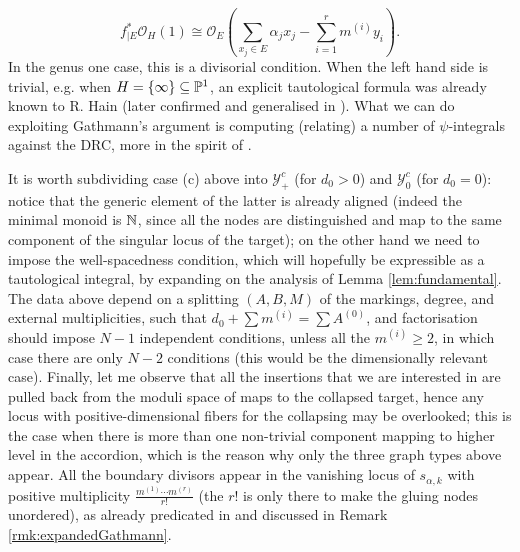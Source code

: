 \[f_{|E}^*\mathcal O_H(1)\cong\mathcal O_E\left(\sum_{x_j\in E}\alpha_jx_j-\sum_{i=1}^r m^{(i)}y_i\right).\]
In the genus one case, this is a divisorial condition. When the left hand side is trivial, e.g. when $H=\{\infty\}\subseteq \mathbb P^1$, an explicit tautological formula was already known to R. Hain \cite{Hain} (later confirmed and generalised in \cite{JPPZ}). What we can do exploiting Gathmann's argument is computing (relating) a number of $\psi$-integrals against the DRC, more in the spirit of \cite{BSZ}.

It is worth subdividing case (c) above into $\mathcal Y^c_+$ (for $d_0>0$) and $\mathcal Y^c_0$ (for $d_0=0$): notice that the generic element of the latter is already aligned (indeed the minimal monoid is $\mathbb{N}$, since all the nodes are distinguished and map to the same component of the singular locus of the target); on the other hand we need to impose the well-spacedness condition, which will hopefully be expressible as a tautological integral, by expanding on the analysis of Lemma \ref{lem:fundamental}. The data above depend on a splitting $(A,B,M)$ of the markings, degree, and external multiplicities, such that $d_0+\sum m^{(i)}=\sum A^{(0)}$, and factorisation should impose $N-1$ independent conditions, unless all the $m^{(i)}\geq 2$, in which case there are only $N-2$ conditions (this would be the dimensionally relevant case). Finally, let me observe that all the insertions that we are interested in are pulled back from the moduli space of maps to the collapsed target, hence any locus with positive-dimensional fibers for the collapsing may be overlooked; this is the case when there is more than one non-trivial component mapping to higher level in the accordion, which is the reason why only the three graph types above appear. All the boundary divisors appear in the vanishing locus of $s_{\alpha,k}$ with positive multiplicity $\frac{m^{(1)}\cdots m^{(r)}}{r!}$ (the $r!$ is only there to make the gluing nodes unordered), as already predicated in \cite{Vre} and discussed in Remark \ref{rmk:expandedGathmann}.

